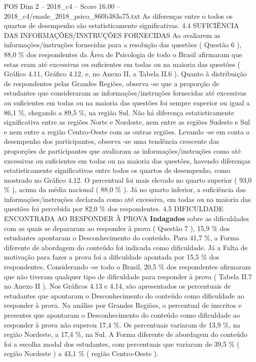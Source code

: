 \begin{textsample}{POS Dim 2 – 2018\_c4 – Score 16.00 – 2018\_c4/enade\_2018\_psico\_860b383a75.txt}
As diferenças entre o todos os quartos de desempenho são estatisticamente significativas. 4.4 SUFICIÊNCIA DAS INFORMAÇÕES/INSTRUÇÕES FORNECIDAS Ao avaliarem as informações/instruções fornecidas para a resolução das questões ( Questão 6 ), 88,0 \% dos respondentes da Área de Psicologia de todo o Brasil afirmaram que estas eram até excessivas ou suficientes em todas ou na maioria das questões ( Gráfico 4.11, Gráfico 4.12, e, no Anexo II, a Tabela II.6 ).
Quanto à distribuição de respondentes pelas Grandes Regiões, observa -se que a proporção de estudantes que consideraram as informações/instruções fornecidas até excessivas ou suficientes em todas ou na maioria das questões foi sempre superior ou igual a 86,1 \%, chegando a 89,5 \%, na região Sul.
Não há diferença estatisticamente significativa entre as regiões Norte e Nordeste, nem entre as regiões Sudeste e Sul e nem entre a região Centro-Oeste com as outras regiões.
Levando -se em conta o desempenho dos participantes, observa -se uma tendência crescente das proporções de participantes que avaliaram as informações/instruções como até excessivas ou suficientes em todas ou na maioria das questões, havendo diferenças estatisticamente significativas entre todos os quartos de desempenho, como mostrado no Gráfico 4.12.
O percentual foi mais elevado no quarto superior ( 93,0 \% ), acima da média nacional ( 88,0 \% ).
Já no quarto inferior, a suficiência das informações/instruções declarada como até excessiva, em todas ou na maioria das questões foi percebida por 82,0 \% dos respondentes. 4.5 DIFICULDADE ENCONTRADA AO RESPONDER À PROVA \textbf{Indagados} sobre as dificuldades com as quais se depararam ao responder à prova ( Questão 7 ), 15,9 \% dos estudantes apontaram o Desconhecimento do conteúdo.
Para 41,7 \%, a Forma diferente de abordagem do conteúdo foi indicada como dificuldade.
Já a Falta de motivação para fazer a prova foi a dificuldade apontada por 15,5 \% dos respondentes.
Considerando -se todo o Brasil, 20,5 \% dos respondentes afirmaram que não tiveram qualquer tipo de dificuldade para responder à prova ( Tabela II.7 no Anexo II ).
Nos Gráficos 4.13 e 4.14, são apresentados os percentuais de estudantes que apontaram o Desconhecimento do conteúdo como dificuldade ao responder à prova.
Na análise por Grandes Regiões, o percentual de inscritos e presentes que apontaram o Desconhecimento do conteúdo como dificuldade ao responder à prova não superou 17,4 \%.
Os percentuais variaram de 13,9 \%, na região Nordeste, a 17,4 \%, na Sul.
A Forma diferente de abordagem do conteúdo foi a escolha modal dos estudantes, com percentuais que variaram de 39,5 \% ( região Nordeste ) a 43,1 \% ( região Centro-Oeste ).

\end{textsample}
